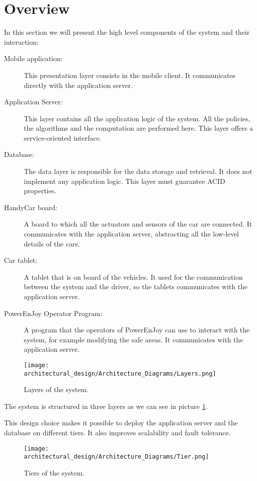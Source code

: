 \section{Overview}
In this section we will present the high level components of the system and their interaction:

\begin{description}
\item[Mobile application:] This presentation layer consists in the mobile client. It communicates directly with the application server.
\item[Application Server:] This layer contains all the application logic of the system. All the policies, the algorithms and the computation are performed here. This layer offers a service-oriented interface.
\item[Database:] The data layer is responsible for the data storage and retrieval. It does not implement any application logic. This layer must guarantee ACID properties. 
\item[HandyCar board:] A board to which all the actuators and sensors of the car are connected.
It communicates with the application server, abstracting all the low-level details of the cars.
\item[Car tablet:] A tablet that is on board of the vehicles. It used for the communication between the system and the driver, so the tablets communicates with the application server.
\item[PowerEnJoy Operator Program:] A program that the operators of PowerEnJoy can use to interact with the system, for example modifying the safe areas. It communicates with the application server.
\end{description}

\begin{figure}
	\centering
	\texttt{[image: architectural\_design/Architecture\_Diagrams/Layers.png]}
	\caption{Layers of the system.}
	\label{fig:layers}
\end{figure}

The system is structured in three layers as we can see in picture \ref{fig:layers}.

This design choice makes it possible to deploy the application server and the database on different tiers. It also improves scalability and fault tolerance.

\begin{figure}
	\centering
	\texttt{[image: architectural\_design/Architecture\_Diagrams/Tier.png]}
	\caption{Tiers of the system.}
	\label{fig:tiers}
\end{figure}

